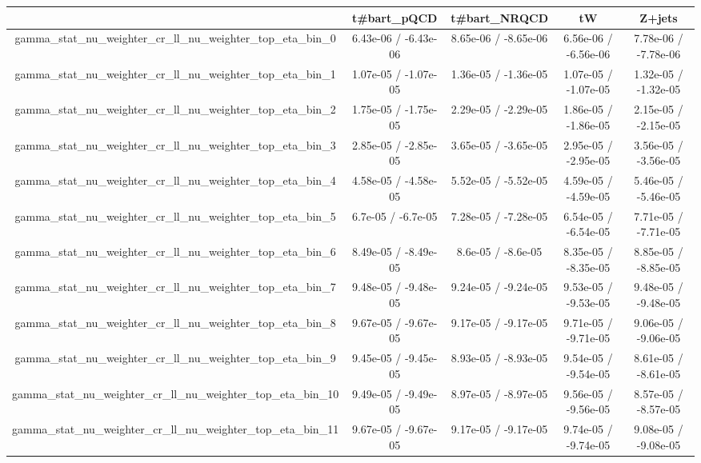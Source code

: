 \documentclass[10pt]{article}
\begin{document}
\begin{table}[htbp]
\begin{center}
\begin{tabular}{|c|c|c|c|c|}
\hline 
      & t#bar{t}_{pQCD}      & t#bar{t}_{NRQCD}      & tW      & Z+jets \\ 
\hline 
  gamma_stat_nu_weighter_cr_ll_nu_weighter_top_eta_bin_0 & 6.43e-06 / -6.43e-06 & 8.65e-06 / -8.65e-06 & 6.56e-06 / -6.56e-06 & 7.78e-06 / -7.78e-06 \\ 
  gamma_stat_nu_weighter_cr_ll_nu_weighter_top_eta_bin_1 & 1.07e-05 / -1.07e-05 & 1.36e-05 / -1.36e-05 & 1.07e-05 / -1.07e-05 & 1.32e-05 / -1.32e-05 \\ 
  gamma_stat_nu_weighter_cr_ll_nu_weighter_top_eta_bin_2 & 1.75e-05 / -1.75e-05 & 2.29e-05 / -2.29e-05 & 1.86e-05 / -1.86e-05 & 2.15e-05 / -2.15e-05 \\ 
  gamma_stat_nu_weighter_cr_ll_nu_weighter_top_eta_bin_3 & 2.85e-05 / -2.85e-05 & 3.65e-05 / -3.65e-05 & 2.95e-05 / -2.95e-05 & 3.56e-05 / -3.56e-05 \\ 
  gamma_stat_nu_weighter_cr_ll_nu_weighter_top_eta_bin_4 & 4.58e-05 / -4.58e-05 & 5.52e-05 / -5.52e-05 & 4.59e-05 / -4.59e-05 & 5.46e-05 / -5.46e-05 \\ 
  gamma_stat_nu_weighter_cr_ll_nu_weighter_top_eta_bin_5 & 6.7e-05 / -6.7e-05 & 7.28e-05 / -7.28e-05 & 6.54e-05 / -6.54e-05 & 7.71e-05 / -7.71e-05 \\ 
  gamma_stat_nu_weighter_cr_ll_nu_weighter_top_eta_bin_6 & 8.49e-05 / -8.49e-05 & 8.6e-05 / -8.6e-05 & 8.35e-05 / -8.35e-05 & 8.85e-05 / -8.85e-05 \\ 
  gamma_stat_nu_weighter_cr_ll_nu_weighter_top_eta_bin_7 & 9.48e-05 / -9.48e-05 & 9.24e-05 / -9.24e-05 & 9.53e-05 / -9.53e-05 & 9.48e-05 / -9.48e-05 \\ 
  gamma_stat_nu_weighter_cr_ll_nu_weighter_top_eta_bin_8 & 9.67e-05 / -9.67e-05 & 9.17e-05 / -9.17e-05 & 9.71e-05 / -9.71e-05 & 9.06e-05 / -9.06e-05 \\ 
  gamma_stat_nu_weighter_cr_ll_nu_weighter_top_eta_bin_9 & 9.45e-05 / -9.45e-05 & 8.93e-05 / -8.93e-05 & 9.54e-05 / -9.54e-05 & 8.61e-05 / -8.61e-05 \\ 
  gamma_stat_nu_weighter_cr_ll_nu_weighter_top_eta_bin_10 & 9.49e-05 / -9.49e-05 & 8.97e-05 / -8.97e-05 & 9.56e-05 / -9.56e-05 & 8.57e-05 / -8.57e-05 \\ 
  gamma_stat_nu_weighter_cr_ll_nu_weighter_top_eta_bin_11 & 9.67e-05 / -9.67e-05 & 9.17e-05 / -9.17e-05 & 9.74e-05 / -9.74e-05 & 9.08e-05 / -9.08e-05 \\ 

\end{tabular}
\end{center}
\end{table}
\end{document}

